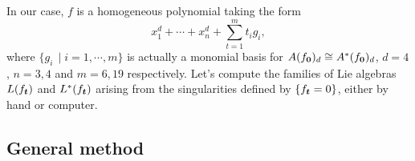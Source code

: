 
In our case,  $f$ is a homogeneous polynomial taking  the form
\[x_1^d+\cdots+x_n^d + \sum_{t=1}^m t_i g_i,\]
where $\{g_i\,\mid i = 1,\cdots, m\}$ is actually a monomial basis for  $A(f_{\boldsymbol 0})_d\cong A^*(f_{\boldsymbol 0})_d$, $d=4$, $n=3,4$ and $m=6,19$ respectively. Let's compute the families of Lie algebras $L(f_{\boldsymbol t})$ and $L^*(f_{\boldsymbol t})$  arising from the singularities defined by $\{f_{\boldsymbol t}=0\}$, either by hand or computer.


\subsection{General method}\label{sec-3.1}
